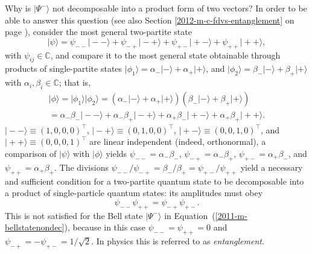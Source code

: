 {Why is $\vert \Psi^-\rangle$ not decomposable into a product form of two vectors?
In order to be able to answer this question
(see also Section \ref{2012-m-c-fdvs-entanglement} on page \pageref{2012-m-c-fdvs-entanglement}), consider
the most general two-partite state
\begin{equation}
\vert \psi \rangle
=
\psi_{--}\vert -- \rangle
+
\psi_{-+}\vert -+ \rangle
+
\psi_{+-}\vert +- \rangle
+
\psi_{++}\vert ++ \rangle
,
\end{equation}
with $\psi_{ij}\in \mathbb{C}$,
and compare it to the most general state obtainable through products of single-partite states
$\vert \phi_1\rangle  = \alpha_-  \vert - \rangle    + \alpha_+  \vert + \rangle$,
and
$\vert \phi_2\rangle  = \beta_-  \vert - \rangle    + \beta_+  \vert + \rangle$
with $\alpha_{i}, \beta_i \in \mathbb{C}$;
that is,
\begin{equation}
\begin{split}
\vert \phi \rangle  =\vert \phi_1\rangle    \vert \phi_2\rangle
 =
(\alpha_-  \vert - \rangle    + \alpha_+  \vert + \rangle )
(\beta_-  \vert - \rangle    + \beta_+  \vert + \rangle )   \\
 =\alpha_- \beta_- \vert -- \rangle    + \alpha_-\beta_+  \vert -+ \rangle +
\alpha_+ \beta_- \vert +- \rangle    + \alpha_+\beta_+  \vert ++ \rangle
.
\end{split}
\end{equation}
$
\vert -- \rangle  \equiv (1,0,0,0)^\intercal
$,
$
\vert -+ \rangle    \equiv (0,1,0,0)^\intercal
$,
$
\vert +- \rangle     \equiv (0,0,1,0)^\intercal
$, and
$
\vert ++ \rangle      \equiv (0,0,0,1)^\intercal
$
are linear independent (indeed, orthonormal),
a comparison of $\vert \psi \rangle  $ with  $\vert \phi \rangle$ yields
$
\psi_{--}=  \alpha_- \beta_-
$, $
\psi_{-+}=   \alpha_-\beta_+
$, $
\psi_{+-}=  \alpha_+ \beta_-
$, and$
\psi_{++}= \alpha_+\beta_+
$.
The divisions
$\psi_{--}/ \psi_{-+} =   \beta_- / \beta_+ =   \psi_{+-} / \psi_{++}$
yield
 a necessary and sufficient condition for a two-partite quantum state to be decomposable
into a product of single-particle quantum states:  its amplitudes must obey
 \begin{equation}
\psi_{--}\psi_{++}  =  \psi_{-+}   \psi_{+-} .
\end{equation}
This is not satisfied for the Bell state $\vert \Psi^-\rangle$ in Equation~(\ref{2011-m-bellstatenondec}),
because in this case $\psi_{--}=\psi_{++} =0$
and  $ \psi_{-+} = - \psi_{+-} =1/\sqrt{2}$.
In physics this is referred to as {\em entanglement}.\cite[-80mm]{CambridgeJournals:1737068,CambridgeJournals:2027212,schrodinger}

}
